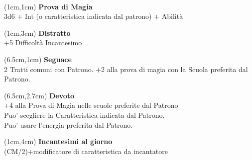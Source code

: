 \documentclass[a4paper,12 pt,openany]{book}
\begin{document}
	~\newpage

\begin{textblock*}{5cm}(1cm,1cm) %
		\textbf{Prova di Magia}\\
3d6 + Int (o caratteristica indicata dal patrono) + Abilità		
	\end{textblock*}

\begin{textblock*}{5cm}(1cm,3cm) %
	\textbf{Distratto}\\
	+5 Difficoltà Incantesimo
\end{textblock*}

\begin{textblock*}{13.5cm}(6.5cm,1cm) %
	\textbf{Seguace}\\
2 Tratti comuni con Patrono. +2 alla prova di magia con la Scuola preferita dal Patrono.\\
\end{textblock*}

\begin{textblock*}{13.5cm}(6.5cm,2.7cm) %
	\textbf{Devoto}\\
+4 alla Prova di Magia nelle scuole preferite dal Patrono\\
Puo' scegliere la Caratteristica indicata dal Patrono.\\
Puo' usare l'energia preferita dal Patrono.\\
\end{textblock*}
	
\begin{textblock*}{5cm}(1cm,4cm) %
\textbf{Incantesimi al giorno}\\
(CM/2)+modificatore di caratteristica da incantatore
\end{textblock*}	
	 


	 

	 	~\newpage


	
\end{document}

